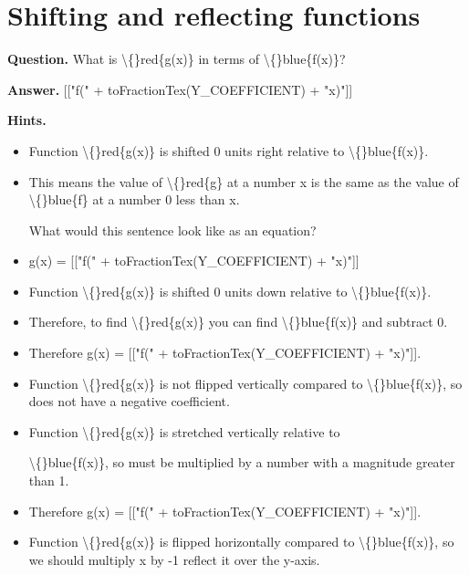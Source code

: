 \documentclass{article}
\begin{document}
\section*{Shifting and reflecting functions}
\textbf{Question.} What is \textbackslash\{\}red\{g(x)\} in terms of \textbackslash\{\}blue\{f(x)\}?

\textbf{Answer.} [["f(" + toFractionTex(Y\_COEFFICIENT) + "x)"]]

\textbf{Hints.}
\begin{itemize}
  \item Function \textbackslash\{\}red\{g(x)\} is shifted 0 units right relative to \textbackslash\{\}blue\{f(x)\}.
  \item This means the value of \textbackslash\{\}red\{g\} at a number x is the same as the value
                                of \textbackslash\{\}blue\{f\} at a number 0 less than x.
                            
                        
                        What would this sentence look like as an equation?
  \item g(x) = [["f(" + toFractionTex(Y\_COEFFICIENT) + "x)"]]
  \item Function \textbackslash\{\}red\{g(x)\} is shifted 0 units down relative to \textbackslash\{\}blue\{f(x)\}.
  \item Therefore, to find \textbackslash\{\}red\{g(x)\} you can find \textbackslash\{\}blue\{f(x)\}
                            and subtract 0.
  \item Therefore g(x) = [["f(" + toFractionTex(Y\_COEFFICIENT) + "x)"]].
  \item Function \textbackslash\{\}red\{g(x)\} is not flipped vertically compared to \textbackslash\{\}blue\{f(x)\},
                        so does not have a negative coefficient.
  \item Function \textbackslash\{\}red\{g(x)\} is stretched vertically relative to
                        
                        \textbackslash\{\}blue\{f(x)\},
                        so must be multiplied by a number with a magnitude greater than 1.
  \item Therefore g(x) = [["f(" + toFractionTex(Y\_COEFFICIENT) + "x)"]].
  \item Function \textbackslash\{\}red\{g(x)\} is flipped horizontally compared to \textbackslash\{\}blue\{f(x)\},
                            so we should multiply x by -1 reflect it over the y-axis.
                        

\end{itemize}
\end{document}

